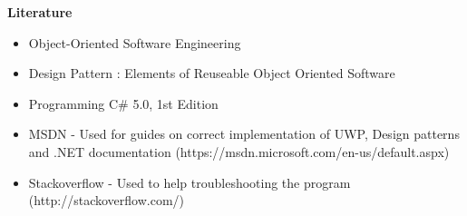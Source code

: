 \documentclass{Article}
\begin{document}
\textbf{Literature}
\begin{itemize}
	\item Object-Oriented Software Engineering
	\item Design Pattern : Elements of Reuseable Object Oriented Software
	\item Programming C\# 5.0, 1st Edition
	\item MSDN - Used for guides on correct implementation of UWP, Design patterns and .NET documentation (https://msdn.microsoft.com/en-us/default.aspx)
	\item Stackoverflow - Used to help troubleshooting the program (http://stackoverflow.com/)
\end{itemize}
\end{document}

